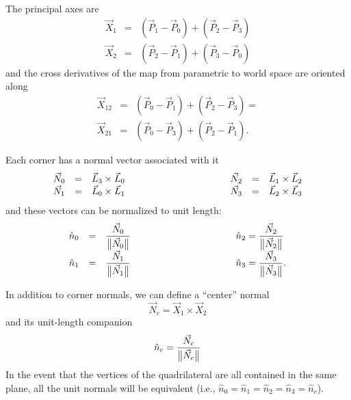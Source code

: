 The principal axes are
\begin{equation*}
\begin{array}{lcl}
\vec X_1 &=& \left(\vec P_1 - \vec P_0\right) + \left(\vec P_2 - \vec P_3\right)\\
\vec X_2 &=& \left(\vec P_2 - \vec P_1\right) + \left(\vec P_3 - \vec P_0\right)
\end{array}
\end{equation*}
and the cross derivatives of the map from parametric to world space are oriented along
\begin{equation*}
\begin{array}{lcl}
\vec X_{12} &=& \left(\vec P_0 - \vec P_1\right) + \left(\vec P_2 - \vec P_3\right) =\\
\vec X_{21} &=& \left(\vec P_0 - \vec P_3\right) + \left(\vec P_2 - \vec P_1\right).
\end{array}
\end{equation*}

Each corner has a normal vector associated with it
\begin{equation*}
\begin{array}{lcl}
\vec N_0 &=& \vec L_3 \times \vec L_0\\
\vec N_1 &=& \vec L_0 \times \vec L_1
\end{array}
\rule{10em}{0pt}
\begin{array}{lcl}
\vec N_2 &=& \vec L_1 \times \vec L_2\\
\vec N_3 &=& \vec L_2 \times \vec L_3
\end{array}
\end{equation*}
and these vectors can be normalized to unit length:
\begin{equation*}
\begin{array}{lcl}
\hat n_0 &=& \dfrac{\vec N_0}{\normvec{ N_0}}\\
\hat n_1 &=& \dfrac{\vec N_1}{\normvec{ N_1}}
\end{array}
\rule{10em}{0pt}
\begin{array}{lcl}
\hat n_2 = \dfrac{\vec N_2}{\normvec{ N_2}}\\
\hat n_3 = \dfrac{\vec N_3}{\normvec{ N_3}}.
\end{array}
\end{equation*}

In addition to corner normals, we can define a ``center'' normal
\begin{equation*}
\vec N_{c} = \vec X_1 \times \vec X_2
\end{equation*}
and its unit-length companion
\begin{equation*}
\hat n_{c} = \frac{\vec N_{c}}{\big\lVert{\vec N_{c}}\big\rVert}
\end{equation*}
In the event that the vertices of the quadrilateral are all
contained in the same plane, all the unit normals will be
equivalent (i.e., $\hat n_0 = \hat n_1 = \hat n_2 = \hat n_3 = \hat n_c$).

